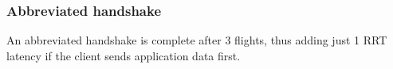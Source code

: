 \subsubsection{Abbreviated handshake}

An abbreviated handshake is complete after 3 flights, thus adding just 1 RRT latency if the client sends application data first.



